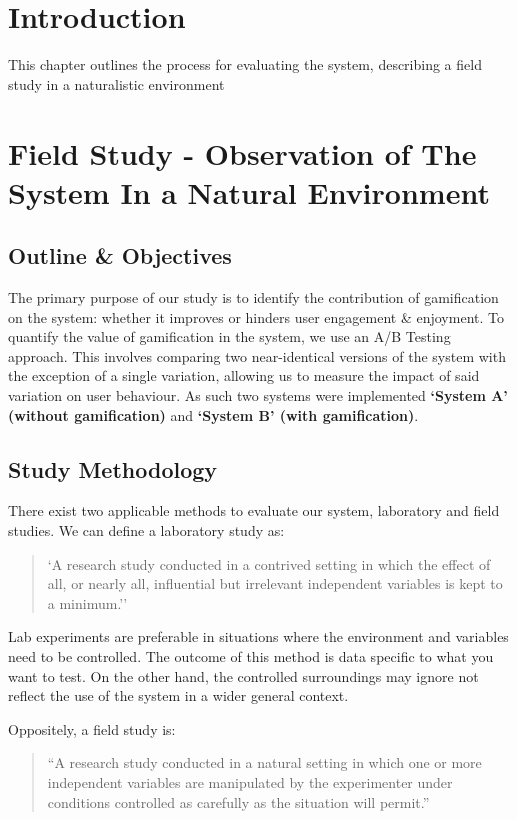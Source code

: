\section{Introduction}
This chapter outlines the process for evaluating the system, describing a field study in a naturalistic environment 
\section{Field Study - Observation of The System In a Natural Environment}
\subsection{Outline \& Objectives}
The primary purpose of our study is to identify the contribution of gamification on the system: whether it improves or hinders user engagement \& enjoyment. To quantify the value of gamification in the system, we use an A/B Testing~\cite{ABTesting} approach. This involves comparing two near-identical versions of the system with the exception of a single variation, allowing us to measure the impact of said variation on user behaviour. As such two systems were implemented \textbf{`System A' (without gamification)} and \textbf{`System B' (with gamification)}. 

\subsection{Study Methodology}
There exist two applicable methods to evaluate our system, laboratory and field studies. We can define a laboratory study as:
\begin{quotation}
\noindent
`A research study conducted in a contrived setting in which the effect of all, or nearly all, influential but irrelevant independent variables is kept to a minimum.''~\cite[p.~215]{marketStudy}
 \end{quotation}

Lab experiments are preferable in situations where the environment and variables need to be controlled. The outcome of this method is data specific to what you want to test. On the other hand, the controlled surroundings may ignore not reflect the use of the system in a wider general context.

Oppositely, a field study is:
\begin{quotation}
\noindent
``A research study conducted in a natural setting in which one or more independent variables are manipulated by the experimenter under conditions controlled as carefully as the situation will permit.''\cite[p. 211]{marketStudy}
 \end{quotation}

